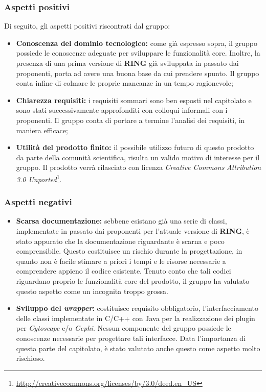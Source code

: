 \subsubsection{Aspetti positivi}
\label{aspettipos2}
Di seguito, gli aspetti positivi riscontrati dal gruppo:
\begin{itemize}
\item\textbf{Conoscenza del dominio tecnologico:} come già espresso sopra, il gruppo possiede le conoscenze adeguate per sviluppare le funzionalità core. Inoltre, la presenza di una prima versione di \textbf{RING} già sviluppata in passato dai proponenti, porta ad avere una buona base da cui prendere spunto. Il gruppo conta infine di colmare le proprie mancanze in un tempo ragionevole;
\item\textbf{Chiarezza requisiti:} i requisiti sommari sono ben esposti nel capitolato e sono stati successivamente approfonditi con colloqui informali con i proponenti. Il gruppo conta di portare a termine l'analisi dei requisiti, in maniera efficace;
\item\textbf{Utilità del prodotto finito:} il possibile utilizzo futuro di questo prodotto da parte della comunità scientifica, risulta un valido motivo di interesse per il gruppo. Il prodotto verrà rilasciato con licenza \textit{Creative Commons} \textit{Attribution 3.0 Unported}\footnote{\url{http://creativecommons.org/licenses/by/3.0/deed.en_US}}.
\end{itemize}

\subsubsection{Aspetti negativi}
\label{aspettineg2}
\begin{itemize}
\item\textbf{Scarsa documentazione:} sebbene esistano già una serie di classi, implementate in passato dai proponenti per l'attuale versione di \textbf{RING}, è stato appurato che la documentazione riguardante è scarna e poco comprensibile. Questo costituisce un rischio durante la progettazione, in quanto non è facile stimare a priori i tempi e le risorse necessarie a comprendere appieno il codice esistente. Tenuto conto che tali codici riguardano proprio le funzionalità core del prodotto, il gruppo ha valutato questo aspetto come un incognita troppo grossa.
\item\textbf{Sviluppo del \textit{wrapper}:} costituisce requisito obbligatorio, l'interfacciamento delle classi implementate in C/C++\glossario{} con Java per la realizzazione dei plugin per \textit{Cytoscape} e/o \textit{Gephi}. Nessun componente del gruppo possiede le conoscenze necessarie per progettare tali interfacce. Data l'importanza di questa parte del capitolato, è stato valutato anche questo come aspetto molto rischioso.
\end{itemize}

